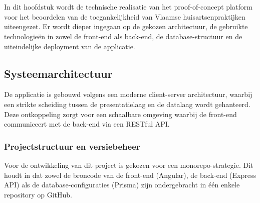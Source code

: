 \chapter{}%
\label{ch:implementatie}

In dit hoofdstuk wordt de technische realisatie van het proof-of-concept platform voor het beoordelen van de toegankelijkheid van Vlaamse huisartsenpraktijken uiteengezet. 
Er wordt dieper ingegaan op de gekozen architectuur, de gebruikte technologieën in zowel de front-end als back-end, de database-structuur en de uiteindelijke deployment van de applicatie.

\section{Systeemarchitectuur}
\label{sec:systeemarchitectuur}

De applicatie is gebouwd volgens een moderne client-server architectuur, waarbij een strikte scheiding tussen de presentatielaag en de datalaag wordt gehanteerd. 
Deze ontkoppeling zorgt voor een schaalbare omgeving waarbij de front-end communiceert met de back-end via een RESTful API.

\subsection{Projectstructuur en versiebeheer}
\label{subsec:projectstructuur}

Voor de ontwikkeling van dit project is gekozen voor een monorepo-strategie. 
Dit houdt in dat zowel de broncode van de front-end (Angular), de back-end (Express API) als de database-configuraties (Prisma) zijn ondergebracht in één enkele repository op GitHub.
\medskip

